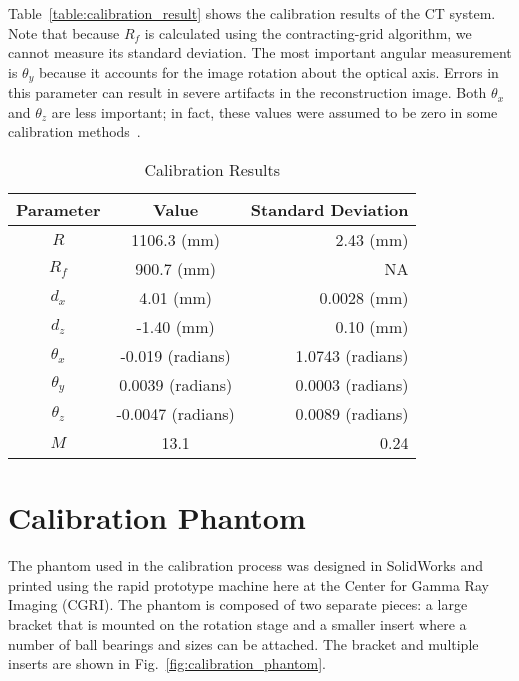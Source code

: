 Table~\ref{table:calibration_result} shows the calibration results of the CT system.  Note that because $R_f$ is calculated using the contracting-grid algorithm, we cannot measure its standard deviation.  The most important angular measurement is $\theta_y$ because it accounts for the image rotation about the optical axis.  Errors in this parameter can result in severe artifacts in the reconstruction image.  Both $\theta_x$ and $\theta_z$ are less important; in fact, these values were assumed to be zero in some calibration methods~\citep{Noo2000, Cho2005, Yang2006}.  
%
\begin{center}
	\begin{table}[ht]\caption{Calibration Results}
		\begin{tabular}{c | c | r}
		\hline
		Parameter &	Value & Standard Deviation \\ \hline \hline
		$R$ & 1106.3 (mm) & 2.43 (mm)\\ \hline
		$R_f$ & 900.7 (mm)&  NA \\ \hline
		$d_x$ & 4.01 (mm)& 0.0028 (mm)\\ \hline
		$d_z$ & -1.40 (mm)& 0.10 (mm)\\ \hline
		$\theta_x$ & -0.019 (radians)& 1.0743 (radians)\\ \hline
		$\theta_y$ & 0.0039 (radians)& 0.0003 (radians)\\ \hline
		$\theta_z$ & -0.0047 (radians)& 0.0089 (radians)\\ \hline	
		$M$ & 13.1 & 0.24 \\ \hline
		\end{tabular}
	\end{table}
	\label{table:calibration_result}
\end{center}

\section{Calibration Phantom}
The phantom used in the calibration process was designed in SolidWorks and printed using the rapid prototype machine here at the Center for Gamma Ray Imaging (CGRI).  The phantom is composed of two separate pieces: a large bracket that is mounted on the rotation stage and a smaller insert where a number of ball bearings and sizes can be attached.  The bracket and multiple inserts are shown in Fig.~\ref{fig:calibration_phantom}.

